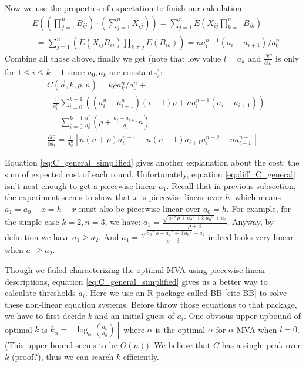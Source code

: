 Now we use the properties of expectation to finish our calculation:
\begin{align*}
  &E\left( \left( \prod_{j=1}^n B_{ij} \right) \cdot \left(\sum_{j=1}^n X_{ij}
  \right) \right) = \sum_{j=1}^n E\left( X_{ij} \prod_{k=1}^nB_{ik} \right)
  \\
    &~~ = \sum_{j=1}^n \left( E(X_{ij} B_{ij}) \prod_{k \neq j} E(B_{ik})
    \right)
       = n a_{i}^{n-1} (a_{i}-a_{i+1}) / a_0^n
\end{align*}
Combine all those above, finally we get (note that low value $l = a_k$ and
$\frac{\partial C}{\partial a_i}$ is only for $1 \leq i \leq k-1$ since
$a_0, a_k$ are constants):
\begin{align}
& C(\vec a, k, \rho, n) = k \rho a_k^n / a_0^n + \nonumber\\ 
    &~~~ \frac{1}{a_0^n} \sum_{i=0}^{k-1} \left( (a_{i}^n-a_{i+1}^n) (i+1)
    \rho + n a_{i}^{n-1} (a_{i}-a_{i+1}) \right) \label{eq:C_general} \\
    &~= \sum_{i=0}^{k-1} \frac{a_i^n}{a_0^n} \left( \rho + \frac{a_i-a_{i+1}}{a_{i}} n \right)
    \label{eq:C_general_simplified}\\
& \frac{\partial C}{\partial a_i} = \frac{1}{a_0^n} \left[
	n(n+\rho)a_i^{n-1}-n(n-1)a_{i+1}a_i^{n-2}-n a_{i-1}^{n-1} \right]
	\label{eq:diff_C_general}
\end{align}

Equation \ref{eq:C_general_simplified} gives another explanation about the
cost: the sum of expected cost of each round. Unfortunately, equation
\ref{eq:diff_C_general} isn't neat enough to get a piecewise linear $a_1$.
Recall that in previous subsection, the experiment seems to show that $x$ is
piecewise linear over $h$, which means $a_1 = a_0-x = h-x$ must also be
piecewise linear over $a_0 = h$.  For example, for the simple case $k = 2, n =
3$, we have: $a_1 =
\frac{\sqrt{{a_0}^{2}\,\rho+{a_2}^{2}+3\,{a_0}^{2}}+a_2}{\rho+3}$.  Anyway, by
definition we have $a_1 \geq a_2$. And
$a_1=\frac{\sqrt{{a_0}^{2}\,\rho+{a_2}^{2}+3\,{a_0}^{2}}+a_2}{\rho+3}$ indeed
looks very linear when $a_1 \geq a_2$.

Though we failed characterizing the optimal MVA using piecewise linear
descriptions, equation \ref{eq:C_general_simplified} gives us a better way to
calculate thresholds $a_i$. Here we use an R package called BB [cite BB] to
solve these non-linear equation systems. Before throw those equations to that
package, we have to first decide $k$ and an initial guess of $a_i$.  One
obvious upper upbound of optimal $k$ is $k_\alpha = \left\lceil \log_{\alpha}
\left(\frac{a_k}{a_0}\right) \right\rceil$ where $\alpha$ is the optimal
$\alpha$ for $\alpha$-MVA when $l = 0$.  (This upper bound seems to be
$\Theta(n)$). We believe that $C$ has a single peak over $k$ (proof?), thus we
can search $k$ efficiently.

